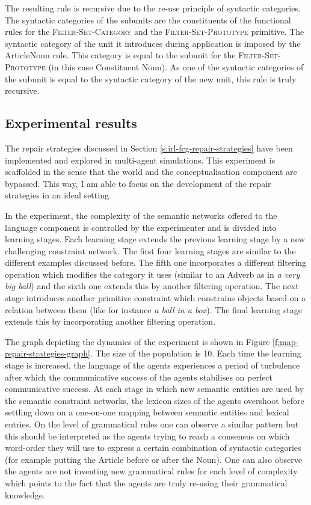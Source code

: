 The resulting rule is recursive due to the re-use principle of
syntactic categories. The syntactic categories of the subunits are
the constituents of the functional rules for the
\textsc{Filter-Set-Category} and the \textsc{Filter-Set-Prototype}
primitive. The syntactic category of the unit it introduces during
application is imposed by the ArticleNoun rule. This category is equal
to the subunit for the \textsc{Filter-Set-Prototype} (in this case
Constituent Noun). As one of the syntactic categories of the subunit
is equal to the syntactic category of the new unit, this rule is truly
recursive.

\subsection{Experimental results}
\label{s:irl-fcg-experimental-results}

The repair strategies discussed in Section
\ref{s:irl-fcg-repair-strategies} have been implemented and explored
in multi-agent simulations. This experiment is scaffolded in the sense
that the world and the conceptualisation component are bypassed. This
way, I am able to focus on the development of the repair strategies in
an ideal setting.

In the experiment, the complexity of the semantic networks offered to
the language component is controlled by the experimenter and is
divided into learning stages. Each learning stage extends the previous
learning stage by a new challenging constraint network. The first four
learning stages are similar to the different examples discussed
before. The fifth one incorporates a different filtering operation
which modifies the category it uses (similar to an Adverb as in \textit{a
very big ball}) and the sixth one extends this by another filtering
operation. The next stage introduces another primitive constraint
which constrains objects based on a relation between them (like for
instance \textit{a ball in a box}). The final learning stage extends this
by incorporating another filtering operation.

The graph depicting the dynamics of the experiment is shown in Figure
\ref{f:map-repair-strategies-graph}. The size of the population is
10. Each time the learning stage is increased, the language of the
agents experiences a period of turbulence after which the communicative
success of the agents stabilises on perfect communicative success. At
each stage in which new semantic entities are used by the semantic
constraint networks, the lexicon sizes of the agents overshoot before
settling down on a one-on-one mapping between semantic entities and
lexical entries. On the level of grammatical rules one can observe a
similar pattern but this should be interpreted as the agents trying to
reach a consensus on which word-order they will use to express a
certain combination of syntactic categories (for example putting the
Article before or after the Noun). One can also observe the agents are
not inventing new grammatical rules for each level of complexity which
points to the fact that the agents are truly re-using their
grammatical knowledge.

